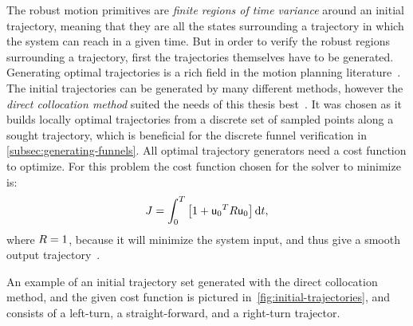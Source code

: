 The robust motion primitives are \textit{finite regions of time variance} around
an initial trajectory, meaning that they are all the states surrounding a
trajectory in which the system can reach in a given time. But in order to verify
the robust regions surrounding a trajectory, first the trajectories themselves
have to be generated. Generating optimal trajectories is a rich field in the
motion planning literature~\cite{Betts_1998}. The initial trajectories can be
generated by many different methods, however the \textit{direct collocation
  method} suited the needs of this thesis best~\cite{von1993numerical}. It was
chosen as it builds locally optimal trajectories from a discrete set of sampled
points along a sought trajectory, which is beneficial for the discrete funnel
verification in \cref{subsec:generating-funnels}. All optimal trajectory
generators need a cost function to optimize. For this problem the cost function
chosen for the solver to minimize is:
\begin{equation}
  J = \int_{0}^{T} \left[ 1 + {{\mathbf{\mathsf{u}}}_{0}}^{T} R {\mathbf{\mathsf{u}}}_{0} \right] \mathrm{d}t,
\end{equation}
where \(R = 1\), because it will minimize the system input, and thus give
a smooth output trajectory~\cite{majumdarRobustOnlineMotion2013}.

An example of an initial trajectory set generated with the direct collocation
method, and the given cost function is pictured
in~\cref{fig:initial-trajectories}, and consists of a left-turn, a
straight-forward, and a right-turn trajector.

